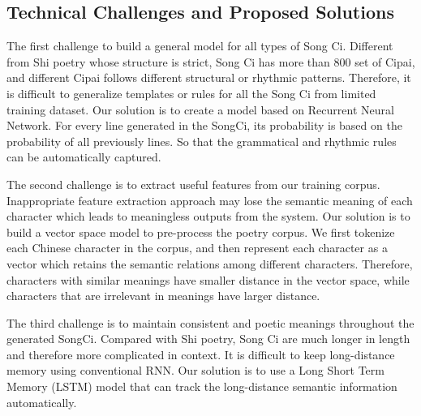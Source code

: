 \subsection{Technical Challenges and Proposed Solutions} 
The first challenge to build a general model for all types of Song Ci.
%
Different from Shi poetry whose structure is strict,  Song Ci has more than 800 set of Cipai, and different Cipai follows different structural or rhythmic patterns.
%
Therefore, it is difficult to generalize templates or rules for all the Song Ci from limited training dataset.
% 
Our solution is to create a model based on Recurrent Neural Network. For every line generated in the SongCi, its probability is based on the probability of all previously lines.
%
So that the grammatical and rhythmic rules can be automatically captured.


The second challenge is to extract useful features from our training corpus.
%
Inappropriate feature extraction approach may lose the semantic meaning of each character which leads to meaningless outputs from the system.
%
Our solution is to build a vector space model to pre-process the poetry corpus. We first tokenize each Chinese character in the corpus, and then represent each character as a vector which retains the semantic relations among different characters. Therefore, characters with similar meanings have smaller distance in the vector space, while characters that are irrelevant in meanings have larger distance. 


The third challenge is to maintain consistent and poetic meanings throughout the generated SongCi.
%
Compared with Shi poetry, Song Ci are much longer in length and therefore more complicated in context.
%
It is difficult to keep long-distance memory using conventional RNN.
% 
Our solution is to use a Long Short Term Memory (LSTM) model that can track the long-distance semantic information automatically. 